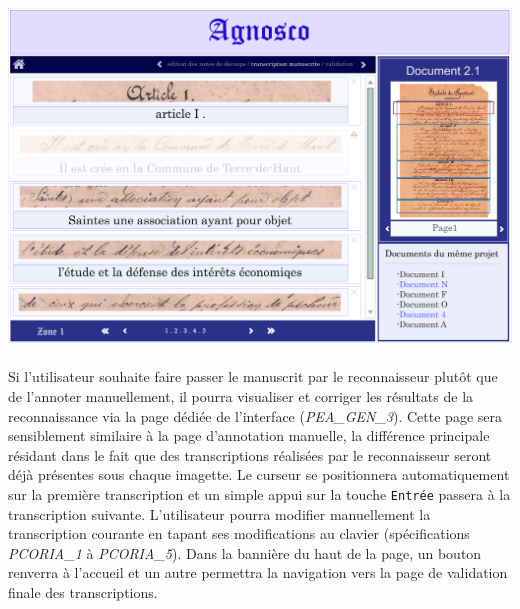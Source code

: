 \begin{mdframed}[frametitle={Figure 4 : Maquette de la page d'annotation manuelle}, innerbottommargin=10]
\begin{center}
\includegraphics[scale=0.04]{assets/maquetteIHMtranscriptionmanu.jpg}
\end{center}
\end{mdframed}

\paragraph{}
Si l’utilisateur souhaite faire passer le manuscrit par le reconnaisseur plutôt que de l’annoter manuellement, il pourra visualiser et corriger les résultats de la reconnaissance via la page dédiée de l’interface (\textit{PEA\_GEN\_3}). Cette page sera sensiblement similaire à la page d’annotation manuelle, la différence principale résidant dans le fait que des transcriptions réalisées par le reconnaisseur seront déjà présentes sous chaque imagette. Le curseur se positionnera automatiquement sur la première transcription et un simple appui sur la touche \texttt{Entrée} passera à la transcription suivante. L’utilisateur pourra modifier manuellement la transcription courante en tapant ses modifications au clavier (spécifications \textit{PCORIA\_1} à \textit{PCORIA\_5}).
\newline{}
Dans la bannière du haut de la page, un bouton renverra à l’accueil et un autre permettra la navigation vers la page de validation finale des transcriptions.

\newpage{}

